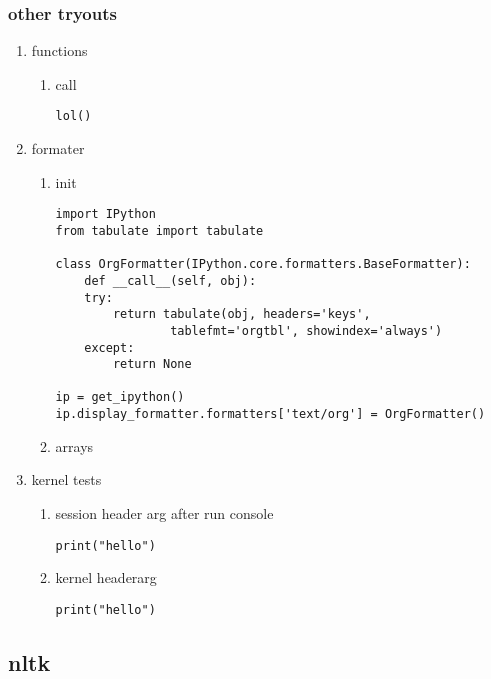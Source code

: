 \documentclass[11pt]{article}
\begin{document}
\subsubsection{other tryouts}
\label{sec:orga8c34d4}
\begin{enumerate}
\item functions
\label{sec:org28a6d80}
\begin{enumerate}
\item call
\label{sec:orgda357e4}
\begin{verbatim}
lol()
\end{verbatim}
\end{enumerate}

\item formater
\label{sec:orgc80394b}
\begin{enumerate}
\item init
\label{sec:org0003edb}
\begin{verbatim}
import IPython
from tabulate import tabulate

class OrgFormatter(IPython.core.formatters.BaseFormatter):
    def __call__(self, obj):
	try:
	    return tabulate(obj, headers='keys',
			    tablefmt='orgtbl', showindex='always')
	except:
	    return None

ip = get_ipython()
ip.display_formatter.formatters['text/org'] = OrgFormatter()
\end{verbatim}
\item arrays
\label{sec:orgd14c4d5}
\end{enumerate}

\item kernel tests
\label{sec:org51fde7b}
\begin{enumerate}
\item session header arg after run console
\label{sec:org54d6587}
\begin{verbatim}
print("hello")
\end{verbatim}
\item kernel headerarg
\label{sec:org90ab166}
\begin{verbatim}
print("hello")
\end{verbatim}
\end{enumerate}
\end{enumerate}
\subsection{nltk}
\label{sec:org57492c4}
\end{document}
